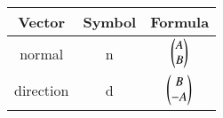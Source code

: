 \begin{tabular}{ |c|c|c|}
    \hline
    \textbf{Vector} & \textbf{Symbol} & \textbf{Formula}\\
    \hline
    normal & n & $\begin{pmatrix}A\\B\end{pmatrix}$ \\
    \hline
    direction & d & $\begin{pmatrix}B\\-A\end{pmatrix}$ \\
    \hline
\end{tabular}
